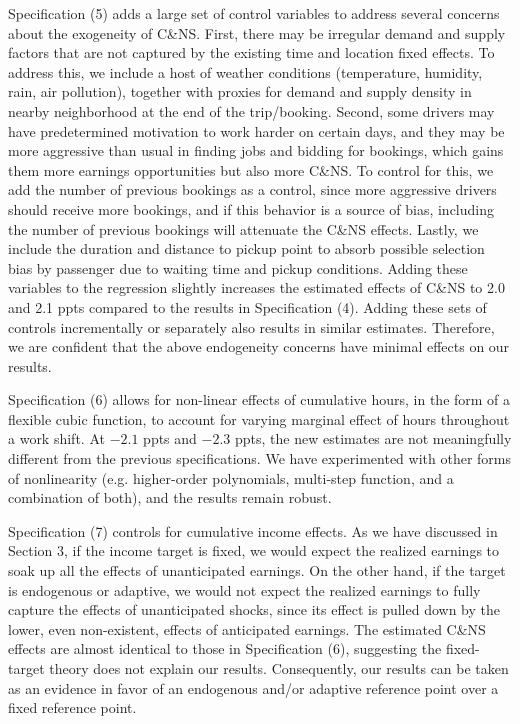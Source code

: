 \documentclass[reviewmode,AEJ]{AEA}
\begin{document}
Specification (5) adds a large set of control variables to address several concerns about the exogeneity 
of C\&NS. First, there may be irregular demand and supply factors that are not captured by the existing
time and location fixed effects. To address this, we include a host of weather conditions (temperature,
humidity, rain, air pollution), together with proxies for demand and supply density in nearby neighborhood 
at the end of the trip/booking. Second, some drivers may have predetermined motivation to work harder on 
certain days, and they may be more aggressive than usual in finding jobs and bidding for bookings, 
which gains them more earnings opportunities but also more  C\&NS. To control for this, we add the number
of previous bookings as a control, since more aggressive drivers should receive more bookings, 
and if this behavior is a source of bias, including the number of previous bookings will attenuate the
C\&NS effects. Lastly, we  include the duration and distance to pickup point to absorb possible selection
bias by passenger due to waiting time and pickup conditions. Adding these variables to the regression 
slightly increases the estimated effects of C\&NS to 2.0 and 2.1 ppts compared to the results in
Specification (4). Adding these sets of controls incrementally or separately also results in similar 
estimates. Therefore, we are confident that the above endogeneity concerns have minimal effects on our results.

Specification (6) allows for non-linear effects of cumulative hours, in the form of a flexible cubic function,
to account for varying marginal effect of hours throughout a work shift. At $-2.1$ ppts and $-2.3$ ppts, 
the new estimates are not meaningfully different from the previous specifications. We have experimented with 
other forms of nonlinearity (e.g. higher-order polynomials, multi-step function, and a combination of both),
and the results remain robust. 

Specification (7) controls for cumulative income effects. As we have discussed in Section 3, if the income
target is fixed, we would expect the realized earnings to soak up all the effects of unanticipated earnings.
On the other hand, if the target is endogenous or adaptive, we would not expect the realized earnings to
fully capture the effects of unanticipated shocks, since its effect is pulled down by the lower, 
even non-existent, effects of anticipated earnings. The estimated C\&NS effects are almost identical to
those in Specification (6), suggesting the fixed-target theory does not explain our results. Consequently, 
our results can be taken as an evidence in favor of an endogenous and/or adaptive reference point over a 
fixed reference point. 
\end{document}
